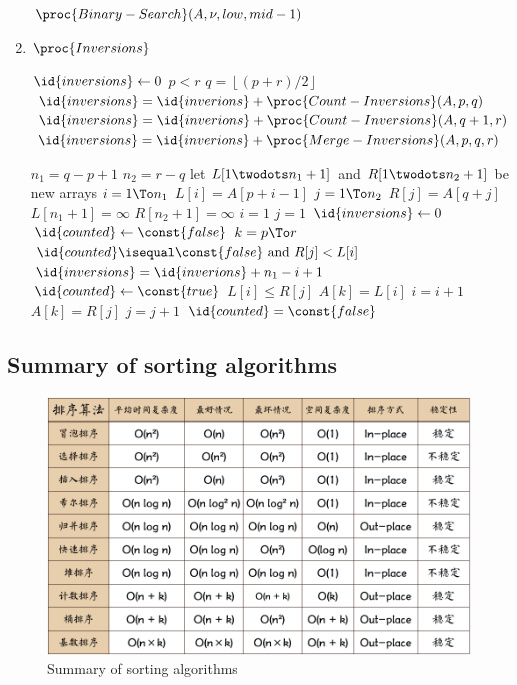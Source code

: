 \documentclass{report}
\newcommand{\floor}[1]{\left\lfloor #1 \right\rfloor}
\begin{document}
\begin{enumerate}
\begin{codebox}
    \li \Else \Return $\proc{Binary-Search}(A, \nu, low, mid-1)$
        \End
    \end{codebox}
    \item $\proc{Inversions}$
    \begin{codebox}
     \label{alg:count-inversions}
    \li $\id{inversions} \gets 0$
    \li \If $p < r$
        \Then 
    \li     $q = \floor{(p+r)/2}$
    \li     $\id{inversions} = \id{inverions} + \proc{Count-Inversions}(A,p,q)$
    \li     $\id{inversions} = \id{inverions} + \proc{Count-Inversions}(A,q+1,r)$
    \li     $\id{inversions} = \id{inverions} + \proc{Merge-Inversions}(A,p,q,r)$
        \End
    \li \Return {}
    \end{codebox}
    \begin{codebox}
    \li $n_1 = q-p+1$
    \li $n_2 = r-q$
    \li let $L[1 \twodots n_1 + 1]$ and $R[1 \twodots n_2 + 1]$ be new arrays 
    \li \For $i = 1 \To n_1$
        \Do 
    \li     $L[i] = A[p+i-1]$
        \End 
    \li \For $j = 1 \To n_2$ 
        \Do 
    \li     $R[j] = A[q+j]$
        \End 
    \li $L[n_1 + 1] = \infty$ 
    \li $R[n_2 + 1] = \infty$
    \li $i = 1$
    \li $j = 1$
    \li $\id{inversions} \gets 0$
    \li $\id{counted} \gets \const{false}$
    \li \For $k = p \To r$
        \Do
    \li     \If $\id{counted} \isequal \const{false} \text{ and } R[j] < L[i]$
            \Then
    \li         $\id{inversions} = \id{inverions} + n_1 - i + 1$
    \li         $\id{counted} \gets \const{true}$
            \End
    \li     \If $L[i] \leq R[j]$
            \Then 
    \li         $A[k] = L[i]$
    \li         $i = i+1$
    \li     \Else $A[k] = R[j]$
    \li         $j = j+1$
    \li         $\id{counted} = \const{false}$
            \End
        \End
    \li \Return {}
    \end{codebox}
\end{enumerate}

\subsection{Summary of sorting algorithms}
\begin{figure}[ht]
    \centering
    \includegraphics[scale=0.3]{figures/sort_algo_summary.png}
    \caption{Summary of sorting algorithms}
    \label{fig:sort_algo_summary}
\end{figure}
\end{document}
